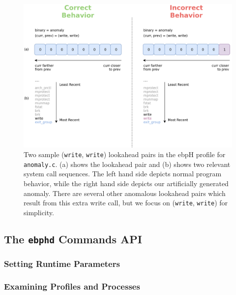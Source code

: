 \documentclass[
  12pt]{findlay}
\begin{document}
\begin{figure}
\includegraphics[height=0.4\textheight]{../figures/lookahead-anomaly.png}
\caption[Two sample (\lstinline{write}, \lstinline{write}) lookahead pairs in the ebpH profile for \texttt{anomaly.c}]{
    Two sample (\lstinline{write}, \lstinline{write}) lookahead pairs in the ebpH profile for \texttt{anomaly.c}.
    (a) shows the lookahead pair and (b) shows two relevant system call sequences. The left hand side depicts normal program
    behavior, while the right hand side depicts our artificially generated anomaly.
    There are several other anomalous lookahead pairs which result from this extra write call, but we focus
    on (\lstinline{write}, \lstinline{write}) for simplicity.
}
\label{anomaly-lookahead-comp}
\end{figure}

\FloatBarrier

\hypertarget{the-ebphd-commands-api}{%
\subsection{\texorpdfstring{The \texttt{ebphd} Commands
API}{The ebphd Commands API}}\label{the-ebphd-commands-api}}

\label{commands_section}

\hypertarget{setting-runtime-parameters}{%
\subsubsection{Setting Runtime
Parameters}\label{setting-runtime-parameters}}

\hypertarget{examining-profiles-and-processes}{%
\subsubsection{Examining Profiles and
Processes}\label{examining-profiles-and-processes}}
\end{document}
